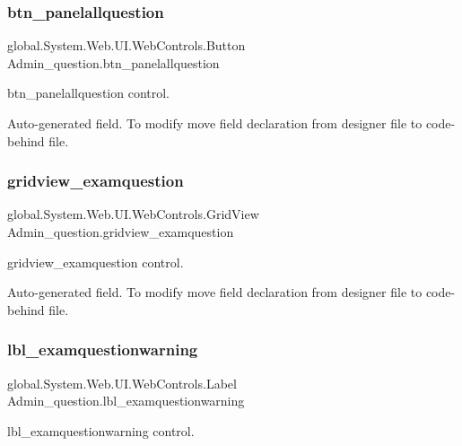 \subsubsection{\texorpdfstring{btn\_panelallquestion}{btn\_panelallquestion}}
{\footnotesize\ttfamily global.\+System.\+Web.\+U\+I.\+Web\+Controls.\+Button Admin\+\_\+question.\+btn\+\_\+panelallquestion\hspace{0.3cm}{\ttfamily [protected]}}



btn\+\_\+panelallquestion control. 

Auto-\/generated field. To modify move field declaration from designer file to code-\/behind file. \mbox{\label{class_admin__question_ae259ea86ecf4d0c89307bfba567b2e9f}} 
\subsubsection{\texorpdfstring{gridview\_examquestion}{gridview\_examquestion}}
{\footnotesize\ttfamily global.\+System.\+Web.\+U\+I.\+Web\+Controls.\+Grid\+View Admin\+\_\+question.\+gridview\+\_\+examquestion\hspace{0.3cm}{\ttfamily [protected]}}



gridview\+\_\+examquestion control. 

Auto-\/generated field. To modify move field declaration from designer file to code-\/behind file. \mbox{\label{class_admin__question_add1d44d49a54e916f5142e04dcc10565}} 
\subsubsection{\texorpdfstring{lbl\_examquestionwarning}{lbl\_examquestionwarning}}
{\footnotesize\ttfamily global.\+System.\+Web.\+U\+I.\+Web\+Controls.\+Label Admin\+\_\+question.\+lbl\+\_\+examquestionwarning\hspace{0.3cm}{\ttfamily [protected]}}



lbl\+\_\+examquestionwarning control. 

